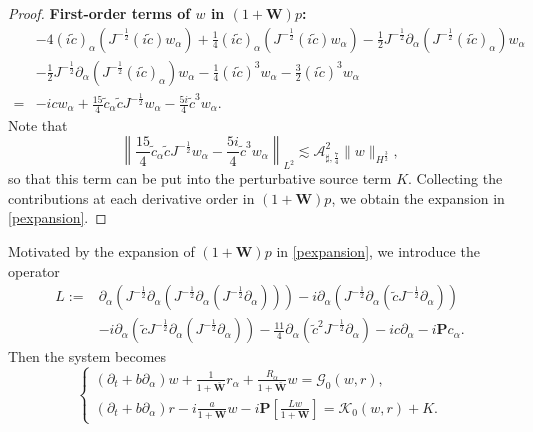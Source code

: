 \documentclass[10pt]{amsart}
\theoremstyle{remark}
\theoremstyle{definition}
\numberwithin{equation}{section}
\newcommand{\p}{\partial}
\newcommand{\al}{\alpha}
\newcommand{\f}{\frac}
\newcommand{\bw}{\mathbf{W}}
\newcommand{\nP}{{\mathbf P}}
\newcommand{\ASSharp}{{\mathcal{A}_{\sharp,\frac{7}{4}}^2}}
\begin{document}
\begin{proof}
{\bf{First-order terms of $w$ in $(1+\mathbf{W})p$:}}
\begin{align*}
&-4(i\tilde{c})_{\al}(J^{-\f12}(i\tilde{c})w_{\al})+\f14(i\tilde{c})_{\al}(J^{-\f12}(i\tilde{c})w_{\al}) -\f12J^{-\f12}\p_{\al}(J^{-\f12}(i\tilde{c})_{\al})w_{\al}
\\
&-\f12J^{-\f12}\p_{\al}(J^{-\f12}(i\tilde{c})_{\al})w_{\al}
-\f14(i\tilde{c})^3w_{\al}-\f32(i\tilde{c})^3w_{\al}\\
=&-icw_{\al}+\f{15}{4}\tilde{c}_{\al}\tilde{c}J^{-\f12}w_{\al}-\f{5i}{4}\tilde{c}^3w_{\al}.
\end{align*}
Note that 
\begin{equation*}
 \left\|\f{15}{4}\tilde{c}_{\al}\tilde{c}J^{-\f12}w_{\al}-\f{5i}{4}\tilde{c}^3w_{\al} \right\|_{L^2} \lesssim \ASSharp \| w\|_{H^\f32} ,
\end{equation*}
so that this term can be put into the perturbative source term $K$.
Collecting the contributions at each derivative order in $(1+\bw)p$, we obtain the expansion in \eqref{pexpansion}. 
\end{proof}

Motivated by the expansion of $(1+\bw)p$ in \eqref{pexpansion}, we introduce the operator
\begin{equation*}
\begin{split}
L:=&\p_{\al}(J^{-\f12}\p_{\al}(J^{-\f12}\p_{\al}(J^{-\f12}\p_{\al}))) -i\p_{\al}\left(J^{-\f12}\p_{\al}\left(\tilde{c}J^{-\f12}\p_{\al}\right)\right)\\
&
-i\p_{\al}\left(\tilde{c}J^{-\f12}\p_{\al}\left(J^{-\f12}\p_{\al}\right)\right)-\f{11}4\p_{\al}\left(\tilde{c}^2J^{-\f12}\p_{\al}\right)
-ic\p_{\al}-i{\nP}c_{\al}.
\end{split}
\end{equation*}
Then the system becomes 
\begin{equation*}
\begin{cases}
(\p_t+b\p_{\al})w+\f{1}{1+\bar{\mathbf{W}}}r_{\al}+\frac{R_{\al}}{1+\bar{\mathbf{W}}}w=\mathcal{G}_0(w,r),\\
(\p_t+b\p_{\al})r-i\frac{a}{1+\mathbf{W}}w-i\nP \left[\f{Lw}{1+\mathbf{W}}\right]=\mathcal{K}_0(w,r)+K.
\end{cases}
\end{equation*}
\end{document}
